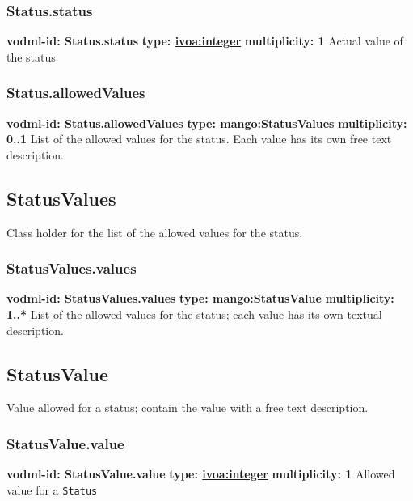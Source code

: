     \subsubsection{Status.status}
    \textbf{vodml-id: Status.status} \newline
    \textbf{type: \hyperref[sect:ivoa]{ivoa:integer}} \newline
    \textbf{multiplicity: 1} \newline
    Actual value of the status

    \subsubsection{Status.allowedValues}
    \textbf{vodml-id: Status.allowedValues} \newline
    \textbf{type: \hyperref[sect:StatusValues]{mango:StatusValues}} \newline
    \textbf{multiplicity: 0..1} \newline
    List of the allowed values for the status. Each value has its own free text description.

  \subsection{StatusValues}
    \label{sect:StatusValues}
    Class holder for the list of the allowed values for the status.

    \subsubsection{StatusValues.values}
    \textbf{vodml-id: StatusValues.values} \newline
    \textbf{type: \hyperref[sect:StatusValue]{mango:StatusValue}} \newline
    \textbf{multiplicity: 1..*} \newline
    List of the allowed values for the status; each value has its own textual description.

  \subsection{StatusValue}
    \label{sect:StatusValue}
    Value allowed for a status; contain the value with a free text description.

    \subsubsection{StatusValue.value}
    \textbf{vodml-id: StatusValue.value} \newline
    \textbf{type: \hyperref[sect:ivoa]{ivoa:integer}} \newline
    \textbf{multiplicity: 1} \newline
    Allowed value for a \texttt{Status}

